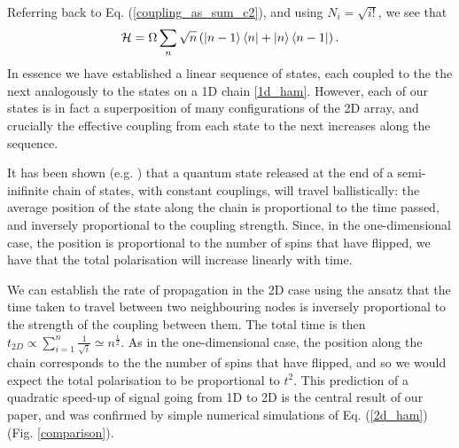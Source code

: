                 Referring back to Eq. (\ref{coupling_as_sum_c2}), and using $N_i=\sqrt{i!}$, we see that
                \begin{equation}
{\cal{H}} = \Omega \sum_{n} \sqrt{n} \left( \left\vert n-1\right\rangle \left\langle n\right\vert +
    \left\vert n\right\rangle \left\langle n-1\right\vert \right) .
\label{2d_ham}
\end{equation}
In essence we have established a linear sequence of states, each coupled to the the next analogously to the states on a 1D chain \ref{1d_ham}. However, each of our states is in fact a superposition of many configurations of the 2D array, and crucially the effective coupling from each state to the next increases along the sequence.



It has been shown (e.g. \cite{Fitzsimons:2005p6472}) that a quantum state released at the end of a semi-inifinite chain of states, with constant couplings, will travel ballistically: the average position of the state along the chain is proportional to the time passed, and inversely proportional to the coupling strength. Since, in the one-dimensional case, the position is proportional to the number of spins that have flipped, we have that the total polarisation will increase linearly with time.

We can establish the rate of propagation in the 2D case using the ansatz that the time taken to travel between two neighbouring nodes is inversely proportional to the strength of the coupling between them. The total time is then $t_{2D}\propto \sum_{i=1}^{n}\frac{1}{\sqrt{i}}\simeq n^{\frac{1}{2}}$. As in the one-dimensional case, the position along the chain corresponds to the the number of spins that have flipped, and so we would expect the total polarisation to be proportional to $t^2$. This prediction of a quadratic speed-up of signal going from 1D to 2D is the central result of our paper, and was confirmed by simple numerical simulations of Eq. (\ref{2d_ham}) (Fig. \ref{comparison}).

